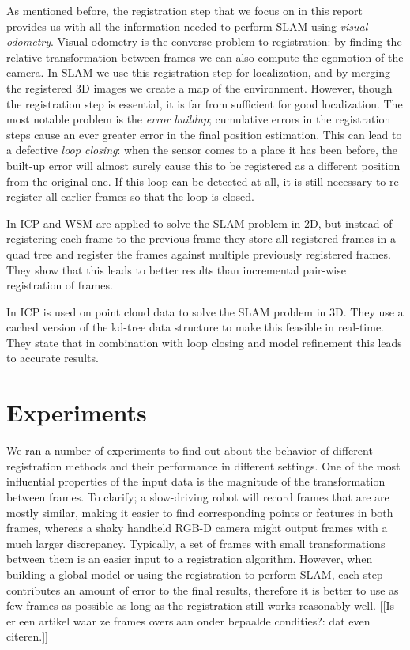 \documentclass[a4paper]{article}
\begin{document}
As mentioned before, the registration step that we focus on in this report provides us with all the information needed to perform \ac{SLAM} using \emph{visual odometry}. Visual odometry is the converse problem to registration: by finding the relative transformation between frames we can also compute the egomotion of the camera. In \ac{SLAM} we use this registration step for localization, and by merging the registered 3D images we create a map of the environment. However, though the registration step is essential, it is far from sufficient for good localization. The most notable problem is the \emph{error buildup}; cumulative errors in the registration steps cause an ever greater error in the final position estimation. This can lead to a defective \emph{loop closing}: when the sensor comes to a place it has been before, the built-up error will almost surely cause this to be registered as a different position from the original one. If this loop can be detected at all, it is still necessary to re-register all earlier frames so that the loop is closed. 

In \cite{slamet2008boosting} \ac{ICP} and \ac{WSM} are applied to solve the \ac{SLAM} problem in 2D, but instead of registering each frame to the previous frame they store all registered frames in a quad tree and register the frames against multiple previously registered frames. They show that this leads to better results than incremental pair-wise registration of frames.

In \cite{nuchter20076d} \ac{ICP} is used on point cloud data to solve the \ac{SLAM} problem in 3D. They use a cached version of the kd-tree data structure to make this feasible in real-time. They state that in combination with loop closing and model refinement this leads to accurate results.

\section{Experiments}

We ran a number of experiments to find out about the behavior of different registration methods and their performance in different settings. One of the most influential properties of the input data is the magnitude of the transformation between frames. To clarify; a slow-driving robot will record frames that are are mostly similar, making it easier to find corresponding points or features in both frames, whereas a shaky handheld RGB-D camera might output frames with a much larger discrepancy. Typically, a set of frames with small transformations between them is an easier input to a registration algorithm. However, when building a global model or using the registration to perform SLAM, each step contributes an amount of error to the final results, therefore it is better to use as few frames as possible as long as the registration still works reasonably well. [[Is er een artikel waar ze frames overslaan onder bepaalde condities?: dat even citeren.]]
\end{document}
